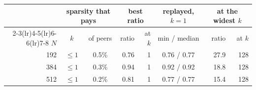 \begin{tabular}{rccrrcrr}
\toprule
& \multicolumn{2}{c}{\textbf{sparsity that pays}} &
  \multicolumn{2}{c}{\textbf{best ratio}} &
  \textbf{replayed, $k{=}1$} &
  \multicolumn{2}{c}{\textbf{at the widest $k$}} \\
\cmidrule(lr){2-3}\cmidrule(lr){4-5}\cmidrule(lr){6-6}\cmidrule(lr){7-8}
$N$ & $k$ & of peers & ratio & at $k$ & min / median & ratio & at $k$ \\
\midrule
192 & $\le 1$ & 0.5\% & 0.76 & 1 & 0.76 / 0.77 & 27.9 & 128 \\
384 & $\le 1$ & 0.3\% & 0.94 & 1 & 0.92 / 0.92 & 18.8 & 128 \\
512 & $\le 1$ & 0.2\% & 0.81 & 1 & 0.77 / 0.77 & 15.4 & 128 \\
\bottomrule
\end{tabular}%
